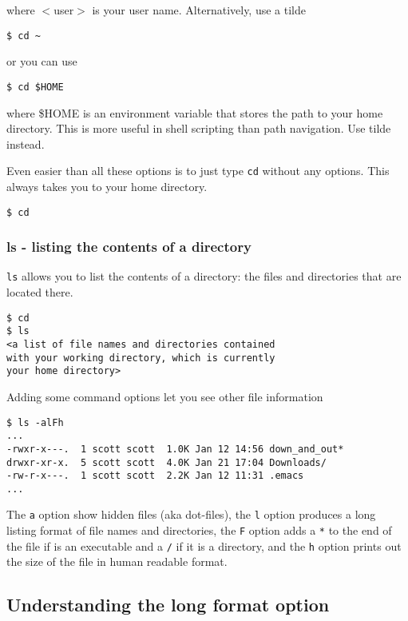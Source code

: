 \documentclass[12pt,hidelinks]{article}
\begin{document}
\begin{appendices}
where $<$user$>$ is your user name. Alternatively, use a tilde
\begin{lstlisting}[style=bash]
$ cd ~
\end{lstlisting}

or you can use
\begin{lstlisting}[style=bash]
$ cd $HOME
\end{lstlisting}

where \$HOME is an environment variable that stores the path to your
home directory. This is more useful in shell scripting than path
navigation. Use tilde instead.

Even easier than all these options is to just type \texttt{cd} without any
options. This always takes you to your home directory.
\begin{lstlisting}[style=bash]
$ cd
\end{lstlisting}

\subsubsection{ls - listing the contents of a directory}
\texttt{ls} allows you to list the contents of a directory: the files and
directories that are located there.

\begin{lstlisting}[style=bash]
$ cd 
$ ls
<a list of file names and directories contained 
with your working directory, which is currently
your home directory>
\end{lstlisting}

Adding some command options let you see other file information

\begin{lstlisting}[style=bash]
$ ls -alFh 
...
-rwxr-x---.  1 scott scott  1.0K Jan 12 14:56 down_and_out*
drwxr-xr-x.  5 scott scott  4.0K Jan 21 17:04 Downloads/
-rw-r-x---.  1 scott scott  2.2K Jan 12 11:31 .emacs
...
 \end{lstlisting}


The \texttt{a} option show hidden files (aka dot-files), the
\texttt{l} option produces a long
listing format of file names and directories, the \texttt{F} option
adds a \texttt{*} to the end of the file if is an executable and a
\texttt{/} if it is a directory, and the \texttt{h} option prints out the size of the
file in human readable format.

\subsection*{Understanding the long format option}


\end{appendices}
\end{document}
